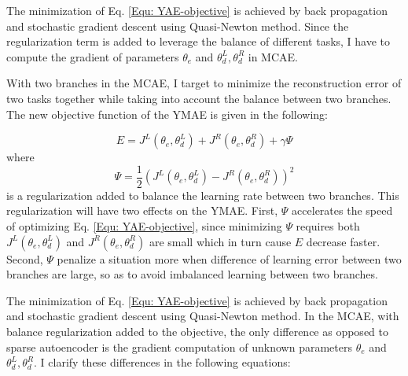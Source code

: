 \documentclass{iitthesis}
\begin{document}
The minimization of Eq. \ref{Equ: YAE-objective} is achieved by back propagation and stochastic gradient descent using Quasi-Newton method. Since the regularization term is added to leverage the balance of different tasks, I have to compute the gradient of parameters $\theta_{e}$ and $\theta_{d}^{L},\theta_{d}^{R}$ in MCAE. 

With two branches in the MCAE, I target to minimize the reconstruction error of two tasks together while taking into account the balance between two branches. The new objective function of the YMAE is given in the following:

\begin{equation}
E=J^{L}(\theta_{e},\theta_{d}^{L})+J^{R}(\theta_{e},\theta_{d}^{R})+\gamma\Psi\label{Equ: YAE-objective}
\end{equation}
where 
\begin{equation}
\Psi=\frac{1}{2}(J^{L}(\theta_{e},\theta_{d}^{L})-J^{R}(\theta_{e},\theta_{d}^{R}))^{2}
\end{equation}
is a regularization added to balance the learning rate between two branches. This regularization will have two effects on the YMAE. First, $\Psi$ accelerates the speed of optimizing Eq. \ref{Equ: YAE-objective}, since minimizing $\Psi$ requires both $J^{L}(\theta_{e},\theta_{d}^{L})$ and $J^{R}(\theta_{e},\theta_{d}^{R})$ are small which in turn cause $E$ decrease faster. Second, $\Psi$ penalize a situation more when difference of learning error between two branches are large, so as to avoid imbalanced learning between two branches.

The minimization of Eq. \ref{Equ: YAE-objective} is achieved by back propagation and stochastic gradient descent using Quasi-Newton method. In the MCAE, with balance regularization added to the objective, the only difference as opposed to sparse autoencoder is the gradient computation of unknown parameters $\theta_{e}$ and $\theta_{d}^{L},\theta_{d}^{R}$. I clarify these differences in the following equations:
\end{document}
